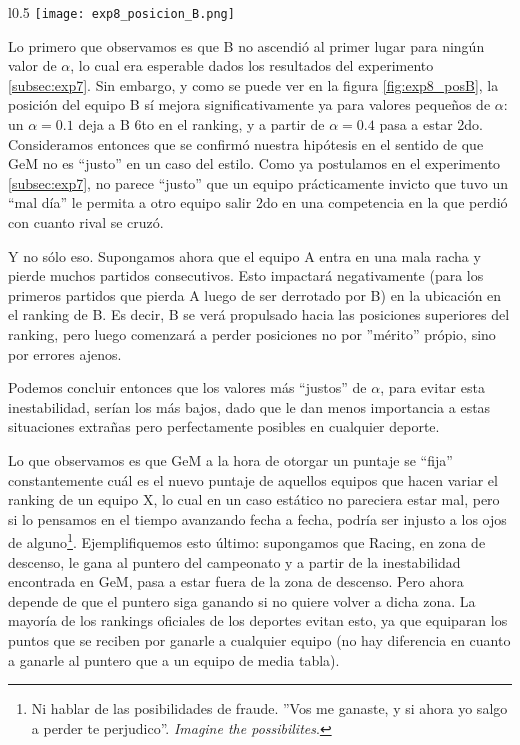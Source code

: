 \begin{wrapfigure}{l}{0.5\textwidth}
    \texttt{[image: exp8\_posicion\_B.png]}
    \caption{Posici\'on del equipo B en el ranking en funci\'on del factor
        $\alpha$ ($c=\alpha$)}
    \label{fig:exp8_posB}
\end{wrapfigure}
\noindent

\par Lo primero que observamos es que B no ascendió al primer lugar para ningún
valor de $\alpha$, lo cual era esperable dados los resultados del experimento
\ref{subsec:exp7}. Sin embargo, y como se puede ver en la figura
\ref{fig:exp8_posB}, la posición del equipo B sí mejora significativamente ya
para valores pequeños de $\alpha$: un $\alpha = 0.1$ deja a B 6to en el ranking,
y a partir de $\alpha = 0.4$ pasa a estar 2do.  Consideramos entonces que se
confirmó nuestra hipótesis en el sentido de que GeM no es ``justo'' en un caso
del estilo. Como ya postulamos en el experimento \ref{subsec:exp7}, no parece
``justo'' que un equipo prácticamente invicto que tuvo un ``mal día'' le permita
a otro equipo salir 2do en una competencia en la que perdió con cuanto rival se
cruzó.

\par Y no s\'olo eso. Supongamos ahora que el equipo A entra en una mala racha
y pierde muchos partidos consecutivos. Esto impactar\'a negativamente (para los
primeros partidos que pierda A luego de ser derrotado por B) en la ubicaci\'on
en el ranking de B. Es decir, B se ver\'a propulsado hacia las posiciones
superiores del ranking, pero luego comenzar\'a a perder posiciones no por
''m\'erito'' pr\'opio, sino por errores ajenos.

\par Podemos concluir entonces que los valores más ``justos'' de $\alpha$, para
evitar esta inestabilidad, serían los más bajos, dado que le dan menos
importancia a estas situaciones extrañas pero perfectamente posibles en
cualquier deporte.

\par Lo que observamos es que GeM a la hora de otorgar un puntaje se ``fija''
constantemente cuál es el nuevo puntaje de aquellos equipos que hacen variar el
ranking de un equipo X, lo cual en un caso est\'atico no pareciera estar mal,
pero si lo pensamos en el tiempo avanzando fecha a fecha, podr\'ia ser injusto a
los ojos de alguno\footnote{Ni hablar de las posibilidades de fraude. ''Vos me
ganaste, y si ahora yo salgo a perder te perjudico''. \emph{Imagine the
possibilites}.}. Ejemplifiquemos esto \'ultimo: supongamos que Racing, en zona
de descenso, le gana al puntero del campeonato y a partir de la inestabilidad
encontrada en GeM, pasa a estar fuera de la zona de descenso. Pero ahora depende
de que el puntero siga ganando si no quiere volver a dicha zona. La mayor\'ia de
los rankings oficiales de los deportes evitan esto, ya que equiparan los puntos
que se reciben por ganarle a cualquier equipo (no hay diferencia en cuanto a
ganarle al puntero que a un equipo de media tabla).

